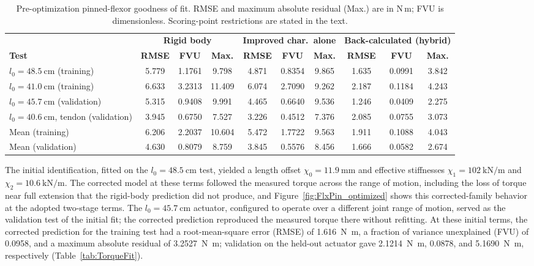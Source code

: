 \begin{table}
\centering\small\setlength{\tabcolsep}{4pt}
\caption[Pre-optimization pinned-flexor goodness of fit]{Pre-optimization pinned-flexor goodness of fit. RMSE and maximum absolute residual (Max.) are in N\,m; FVU is dimensionless. Scoring-point restrictions are stated in the text.}
\label{tab:FlxPinPreGof}
\fontsize{10pt}{12pt}\selectfont
\begin{tabular}{@{}lccccccccc@{}}
\toprule
& \multicolumn{3}{c}{\textbf{Rigid body}} & \multicolumn{3}{c}{\textbf{Improved char.\ alone}} & \multicolumn{3}{c}{\textbf{Back-calculated (hybrid)}} \\
\cmidrule(lr){2-4} \cmidrule(lr){5-7} \cmidrule(l){8-10}
\textbf{Test} & \textbf{RMSE} & \textbf{FVU} & \textbf{Max.} & \textbf{RMSE} & \textbf{FVU} & \textbf{Max.} & \textbf{RMSE} & \textbf{FVU} & \textbf{Max.} \\
\midrule
$l_{0}=\qty{48.5}{\cm}$ (training)           & 5.779 & 1.1761 & 9.798 & 4.871 & 0.8354 & 9.865 & 1.635 & 0.0991 & 3.842 \\
$l_{0}=\qty{41.0}{\cm}$ (training)           & 6.633 & 3.2313 & 11.409 & 6.074 & 2.7090 & 9.262 & 2.187 & 0.1184 & 4.243 \\
$l_{0}=\qty{45.7}{\cm}$ (validation)         & 5.315 & 0.9408 & 9.991 & 4.465 & 0.6640 & 9.536 & 1.246 & 0.0409 & 2.275 \\
$l_{0}=\qty{40.6}{\cm}$, tendon (validation) & 3.945 & 0.6750 & 7.527 & 3.226 & 0.4512 & 7.376 & 2.085 & 0.0755 & 3.073 \\
\midrule
Mean (training)                             & 6.206 & 2.2037 & 10.604 & 5.472 & 1.7722 & 9.563 & 1.911 & 0.1088 & 4.043 \\
Mean (validation)                           & 4.630 & 0.8079 & 8.759 & 3.845 & 0.5576 & 8.456 & 1.666 & 0.0582 & 2.674 \\
\bottomrule
\end{tabular}
\end{table}



The initial identification, fitted on the $l_{0}=\qty{48.5}{\cm}$ test, yielded a length offset $\chi_{0} = \qty{11.9}{\mm}$ and effective stiffnesses $\chi_{1} = \qty{102}{\kN\per\m}$ and $\chi_{2} = \qty{10.6}{\kN\per\m}$. The corrected model at these terms followed the measured torque across the range of motion, including the loss of torque near full extension that the rigid-body prediction did not produce, and Figure~\ref{fig:FlxPin_optimized} shows this corrected-family behavior at the adopted two-stage terms. The $l_{0}=\qty{45.7}{\cm}$ actuator, configured to operate over a different joint range of motion, served as the validation test of the initial fit; the corrected prediction reproduced the measured torque there without refitting. At these initial terms, the corrected prediction for the training test had a root-mean-square error (RMSE) of \qty{1.616}{\newton\meter}, a fraction of variance unexplained (FVU) of 0.0958, and a maximum absolute residual of \qty{3.2527}{\newton\meter}; validation on the held-out actuator gave \qty{2.1214}{\newton\meter}, 0.0878, and \qty{5.1690}{\newton\meter}, respectively (Table~\ref{tab:TorqueFit}).

